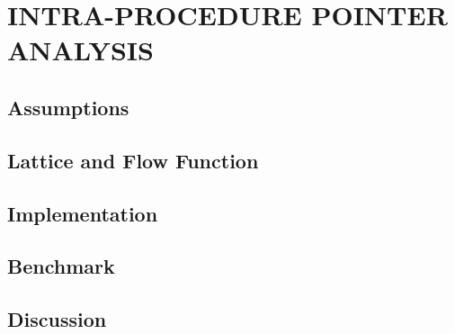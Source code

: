 \section{INTRA-PROCEDURE POINTER ANALYSIS}

\subsection{Assumptions}

\subsection{Lattice and Flow Function}

\subsection{Implementation}

\subsection{Benchmark}

\subsection{Discussion}